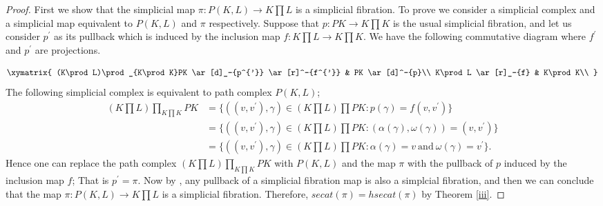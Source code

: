 \documentclass[preprint,11pt %
]{hjm1}
\newtheorem{lemma}[theorem]{Lemma}
\theoremstyle{definition}
\begin{document}
\begin{proof}
First we show that the simplicial map $\pi: P(K,L) \to K  \prod L$ is a simplicial fibration. To prove we consider a simplicial complex and a simplicial map equivalent to $P(K,L)$ and $\pi$ respectively. 
Suppose that $p:PK\to K\prod  K$ is the usual simplicial fibration, and let us consider $p^{'}$ as its pullback which is induced by the inclusion map $f:K\prod  L\to K\prod  K$. We have the following commutative diagram where $f^{'}$ and $p^{'}$ are projections.

\[\xymatrix{
(K\prod  L)\prod _{K\prod  K}PK \ar[d]_-{p^{'}} \ar[r]^-{f^{'}} & PK \ar[d]^-{p}\\
K\prod  L  \ar[r]_-{f} & K\prod  K\\ 
}
\]
The following simplicial complex is equivalent to path complex $P(K,L)$;
\begin{align*}
\textstyle(K\prod  L)\prod_{K\prod  K}PK&=\lbrace  ((v,v^{'}),\gamma) \in \textstyle (K\prod  L) \textstyle \prod  PK :p(\gamma)=f(v,v^{'}) \rbrace \\
&=\lbrace ((v,v^{'}),\gamma) \in \textstyle(K\prod  L) \textstyle \prod  PK:(\alpha(\gamma),\omega (\gamma))=(v,v^{'})   \rbrace \\
&=\lbrace ((v,v^{'}),\gamma) \in \textstyle(K\prod  L) \textstyle\prod PK: \alpha(\gamma)=v  \ \text{and} \  \omega (\gamma) =v^{'} \rbrace.
\end{align*}
Hence one can replace the path complex 
$(K\prod  L)\prod_{K\prod  K}PK$ with $P(K,L)$ and 
 the map $\pi$ with the pullback of $p$ induced by the inclusion map $f$; That is $p^{'} =\pi$.
Now by \cite[Proposition 4.2]{sim}, any pullback of a simplicial fibration map is also a simplcial fibration, and then we can conclude that the map $\pi :P(K,L)\to K\prod  L$ is a simplicial fibration.
Therefore, $secat (\pi) = hsecat (\pi)$ by Theorem \ref{iii}.


\end{proof}
\end{document}
